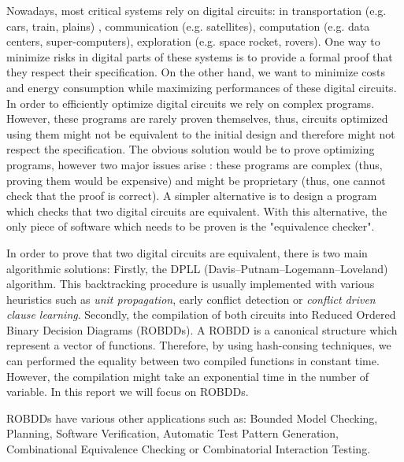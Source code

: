 \documentclass[a4paper,10pt]{article}
\begin{document}
Nowadays, most critical systems rely on digital circuits: in transportation (e.g. cars, train, plains) , communication (e.g. satellites), computation (e.g. data centers, super-computers), exploration (e.g. space rocket, rovers).
One way to minimize risks in digital parts of these systems is to provide a formal proof that they respect their specification.
On the other hand, we want to minimize costs and energy consumption while maximizing performances of these digital circuits.
In order to efficiently optimize digital circuits we rely on complex programs.
However, these programs are rarely proven themselves, thus, circuits optimized using them might not be equivalent to the initial design and therefore might not respect the specification.
The obvious solution would be to prove optimizing programs, however two major issues arise : these programs are complex  (thus, proving them would be expensive) and might be proprietary (thus, one cannot check that the proof is correct).
A simpler alternative is to design a program which checks that two digital circuits are equivalent.
With this alternative, the only piece of software which needs to be proven is the "equivalence checker".


In order to prove that two digital circuits are equivalent, there is two main algorithmic solutions:
Firstly, the DPLL (Davis–Putnam–Logemann–Loveland) algorithm.
This backtracking procedure is usually implemented with various heuristics such as \textit{unit propagation}, early conflict detection or \textit{conflict driven clause learning}.
Secondly, the compilation of both circuits into Reduced Ordered Binary Decision Diagrams (ROBDDs).
A ROBDD is a canonical structure which represent a vector of functions.
Therefore, by using hash-consing techniques, we can performed the equality between two compiled functions in constant time.
However, the compilation might take an exponential time in the number of variable.
In this report we will focus on ROBDDs.


ROBDDs have various other applications such as: Bounded Model Checking, Planning, Software Verification, Automatic Test Pattern Generation, Combinational Equivalence Checking or Combinatorial Interaction Testing.

\end{document}
